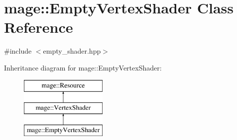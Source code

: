 \hypertarget{classmage_1_1_empty_vertex_shader}{}\section{mage\+:\+:Empty\+Vertex\+Shader Class Reference}
\label{classmage_1_1_empty_vertex_shader}


{\ttfamily \#include $<$empty\+\_\+shader.\+hpp$>$}

Inheritance diagram for mage\+:\+:Empty\+Vertex\+Shader\+:\begin{figure}[H]
\begin{center}
\leavevmode
\includegraphics[height=3.000000cm]{classmage_1_1_empty_vertex_shader}
\end{center}
\end{figure}
